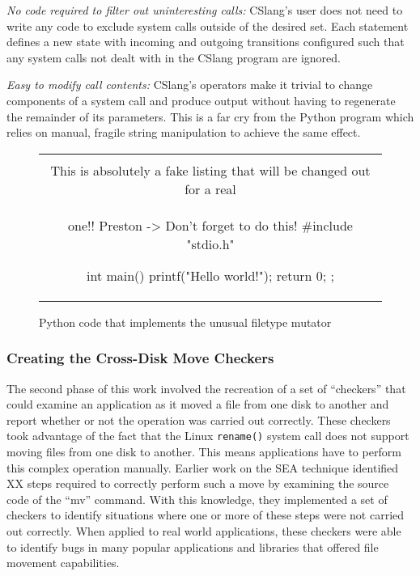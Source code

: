 \textit{No code required to filter out uninteresting calls:}
CSlang's user does
not need to write any code to exclude system
calls outside of the desired set.  Each statement defines a new state with
incoming and outgoing transitions configured such that any system calls not
dealt with in the CSlang program are ignored.

\textit{Easy to modify call contents:}  CSlang's operators make it
trivial to change components of a system call
and produce output without having to regenerate the remainder of its
parameters.
This is a far cry
from the Python program which relies on manual, fragile string manipulation
to achieve the same effect.


\begin{figure}[H]
\centering
\begin{tabular}{c}
\begin{lstlisting}
\\ This is absolutely a fake listing that will be changed out for a real
\\ one!!  Preston -> Don't forget to do this!
#include "stdio.h"

int main() {
    printf("Hello world!\n");
    return 0;
};
\end{lstlisting}
\end{tabular}
\caption{Python code that implements the unusual filetype mutator}
\label{lst:UnusualFiletypePython}
\end{figure}

\subsubsection{Creating the Cross-Disk Move Checkers}

The second phase of this work involved the recreation of a set of
``checkers'' that could examine an application as it moved a file from one
disk to another and report whether or not the operation was carried
out correctly.  These checkers took advantage of the fact that the Linux
{\tt rename()} system call does not support moving files from one disk to
another.  This means applications have to perform this complex
operation manually.  Earlier work on the SEA technique
identified XX steps required to
correctly perform such a move by examining the source code of the ``mv''
command.  With this knowledge, they
implemented a set of checkers to identify situations where one
or more of these steps were not carried out correctly.
When applied to real world applications,
these checkers were able to identify bugs
in many popular applications and libraries that offered file movement
capabilities.

